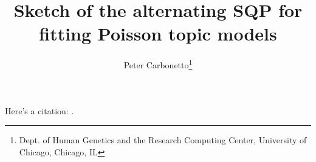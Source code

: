 \documentclass[final]{siamart171218}
\title{Sketch of the alternating SQP for fitting Poisson topic models}
\author{Peter Carbonetto\thanks{Dept. of Human Genetics and the Research Computing Center, University of Chicago, Chicago, IL}}
\begin{document}
\maketitle

Here's a citation: \cite{blei-2003}.



\end{document}
